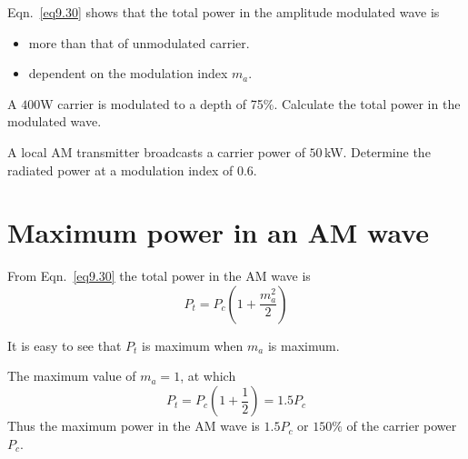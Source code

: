 Eqn.~\eqref{eq9.30} shows that the total power in the amplitude modulated wave is
\begin{itemize}
\item more than that of unmodulated carrier.

\item dependent on the modulation index $m_{a}$.
\end{itemize}

\begin{example}\label{exam9.2}
A $400$W carrier is modulated to a depth of 75\%. Calculate the total power in the modulated wave.
\end{example}


\begin{example}
A local AM transmitter broadcasts a carrier power of $50$\,kW. Determine the radiated power at a modulation index of 0.6.
\end{example}


\eject

\section{Maximum power in an AM wave}\label{sec9.12}

From Eqn.~\eqref{eq9.30} the total power in the AM wave is
$$
P_{t}=P_{c}\left(1+\dfrac{m^{2}_{a}}{2}\right)
$$

It is easy to see that $P_{t}$ is maximum when $m_{a}$ is maximum.

The maximum value of $m_{a}=1$, at which
\begin{equation}
P_{t}=P_{c}\left(1+\dfrac{1}{2}\right)=1.5P_{c}\label{eq9.31}
\end{equation}
Thus the maximum power in the AM wave is $1.5P_{c}$ or $150\%$ of the carrier power $P_{c}$.

